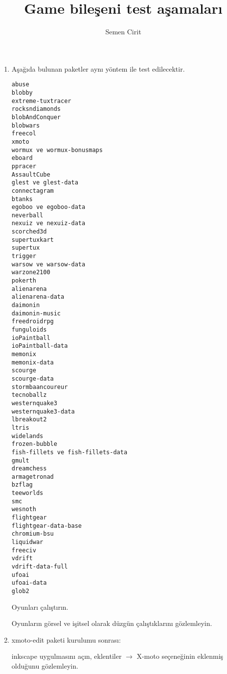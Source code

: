\documentclass[a4paper,10pt]{article}
\title{Game bileşeni test aşamaları}
\author{Semen Cirit}
\begin{document}
\maketitle

\begin{enumerate}
\item Aşağıda bulunan paketler aynı yöntem ile test edilecektir.
\begin{verbatim}
abuse
blobby
extreme-tuxtracer
rocksndiamonds 
blobAndConquer
blobwars
freecol
xmoto
wormux ve wormux-bonusmaps
eboard
ppracer
AssaultCube
glest ve glest-data
connectagram
btanks
egoboo ve egoboo-data
neverball
nexuiz ve nexuiz-data
scorched3d
supertuxkart
supertux
trigger
warsow ve warsow-data
warzone2100
pokerth
alienarena
alienarena-data
daimonin
daimonin-music
freedroidrpg
funguloids
ioPaintball
ioPaintball-data
memonix
memonix-data
scourge
scourge-data
stormbaancoureur
tecnoballz
westernquake3
westernquake3-data
lbreakout2
ltris
widelands
frozen-bubble
fish-fillets ve fish-fillets-data
gmult
dreamchess
armagetronad
bzflag
teeworlds
smc
wesnoth
flightgear
flightgear-data-base
chromium-bsu
liquidwar
freeciv
vdrift
vdrift-data-full
ufoai
ufoai-data
glob2
\end{verbatim}

Oyunları çalıştırın.

Oyunların görsel ve işitsel olarak düzgün çalıştıklarını gözlemleyin.

\item xmoto-edit paketi kurulumu sonrası:

inkscape uygulmasını açın, eklentiler $\rightarrow$ X-moto seçeneğinin eklenmiş olduğunu gözlemleyin.
\end{enumerate}
\end{document}
